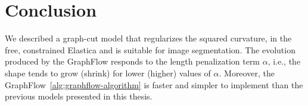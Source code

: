\section{Conclusion}
We described a graph-cut model that regularizes the squared curvature, in the free, constrained Elastica and is suitable for image segmentation. The evolution produced by the GraphFlow responds to the length penalization term $\alpha$, i.e., the shape tends to grow (shrink) for lower (higher) values of $\alpha$.  Moreover, the GraphFlow~\cref{alg:graphflow-algorithm} is faster and simpler to implement than the previous models presented in this thesis.
